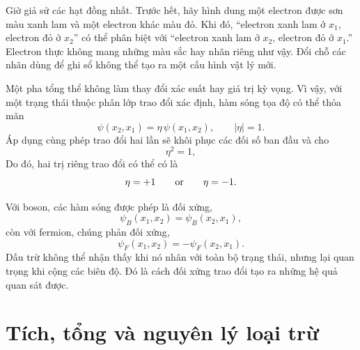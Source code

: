 Giờ giả sử các hạt đồng nhất. Trước hết, hãy hình dung một electron được sơn màu xanh lam và một electron khác màu đỏ. Khi đó, ``electron xanh lam ở \(x_1\), electron đỏ ở \(x_2\)'' có thể phân biệt với ``electron xanh lam ở \(x_2\), electron đỏ ở \(x_1\).'' Electron thực không mang những màu sắc hay nhãn riêng như vậy. Đổi chỗ các nhãn dùng để ghi sổ không thể tạo ra một cấu hình vật lý mới.

Một pha tổng thể không làm thay đổi xác suất hay giá trị kỳ vọng. Vì vậy, với một trạng thái thuộc phân lớp trao đổi xác định, hàm sóng tọa độ có thể thỏa mãn
\begin{equation}
\psi(x_2,x_1)=\eta\,\psi(x_1,x_2),
\qquad
\lvert\eta\rvert=1.
\end{equation}
Áp dụng cùng phép trao đổi hai lần sẽ khôi phục các đối số ban đầu và cho
\begin{equation}
\eta^2=1,
\end{equation}
Do đó, hai trị riêng trao đổi có thể có là
\begin{equation}
\eta=+1
\qquad\hbox{or}\qquad
\eta=-1.
\end{equation}


Với boson, các hàm sóng được phép là đối xứng,
\begin{equation}
\psi_B(x_1,x_2)=\psi_B(x_2,x_1),
\end{equation}
còn với fermion, chúng phản đối xứng,
\begin{equation}
\psi_F(x_1,x_2)=-\psi_F(x_2,x_1).
\end{equation}
Dấu trừ không thể nhận thấy khi nó nhân với toàn bộ trạng thái, nhưng lại quan trọng khi cộng các biên độ. Đó là cách đối xứng trao đổi tạo ra những hệ quả quan sát được.

\section{Tích, tổng và nguyên lý loại trừ}

